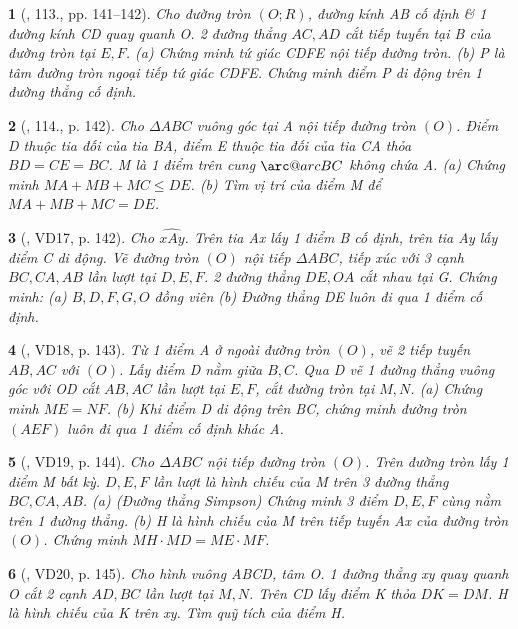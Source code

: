 \documentclass{article}
\makeatletter
\newcommand{\arc@char}{{\usefont{U}{tipa}{m}{n}\symbol{62}}}%
\newcommand{\arc}[1]{\mathpalette\arc@arc{#1}}
\newcommand{\arc@arc}[2]{%
	\sbox0{$\m@th#1#2$}%
	\vbox{
		\hbox{\resizebox{\wd0}{\height}{\arc@char}}
		\nointerlineskip
		\box0
	}%
}
\newtheorem{baitoan}{}
\makeatother
\begin{document}
\begin{baitoan}[\cite{Tuyen_Toan_9_old}, 113., pp. 141--142]
	Cho đường tròn $(O;R)$, đường kính AB cố định \& 1 đường kính CD quay quanh O. 2 đường thẳng $AC,AD$ cắt tiếp tuyến tại B của đường tròn tại $E,F$. (a) Chứng minh tứ giác CDFE nội tiếp đường tròn. (b) P là tâm đường tròn ngoại tiếp tứ giác CDFE. Chứng minh điểm P di động trên 1 đường thẳng cố định.
\end{baitoan}

\begin{baitoan}[\cite{Tuyen_Toan_9_old}, 114., p. 142]
	Cho $\Delta ABC$ vuông góc tại A nội tiếp đường tròn $(O)$. Điểm D thuộc tia đối của tia BA, điểm E thuộc tia đối của tia CA thỏa $BD = CE = BC$. M là 1 điểm trên cung $\arc{BC}$ không chứa A. (a) Chứng minh $MA + MB + MC\le DE$. (b) Tìm vị trí của điểm M để $MA + MB + MC = DE$.
\end{baitoan}

\begin{baitoan}[\cite{Tuyen_Toan_9_old}, VD17, p. 142]
	Cho $\widehat{xAy}$. Trên tia Ax lấy 1 điểm B cố định, trên tia Ay lấy điểm C di động. Vẽ đường tròn $(O)$ nội tiếp $\Delta ABC$, tiếp xúc với 3 cạnh $BC,CA,AB$ lần lượt tại $D,E,F$. 2 đường thẳng $DE,OA$ cắt nhau tại G. Chứng minh: (a) $B,D,F,G,O$ đồng viên (b) Đường thẳng DE luôn đi qua 1 điểm cố định.
\end{baitoan}

\begin{baitoan}[\cite{Tuyen_Toan_9_old}, VD18, p. 143]
	Từ 1 điểm A ở ngoài đường tròn $(O)$, vẽ 2 tiếp tuyến $AB,AC$ với $(O)$. Lấy điểm D nằm giữa $B,C$. Qua D vẽ 1 đường thẳng vuông góc với OD cắt $AB,AC$ lần lượt tại $E,F$, cắt đường tròn tại $M,N$. (a) Chứng minh $ME = NF$. (b) Khi điểm D di động trên BC, chứng minh đường tròn $(AEF)$ luôn đi qua 1 điểm cố định khác A.
\end{baitoan}

\begin{baitoan}[\cite{Tuyen_Toan_9_old}, VD19, p. 144]
	Cho $\Delta ABC$ nội tiếp đường tròn $(O)$. Trên đường tròn lấy 1 điểm M bất kỳ. $D,E,F$ lần lượt là hình chiếu của M trên 3 đường thẳng $BC,CA,AB$. (a) {\rm(Đường thẳng Simpson)} Chứng minh 3 điểm $D,E,F$ cùng nằm trên 1 đường thẳng. (b) H là hình chiếu của M trên tiếp tuyến Ax của đường tròn $(O)$. Chứng minh $MH\cdot MD = ME\cdot MF$.
\end{baitoan}

\begin{baitoan}[\cite{Tuyen_Toan_9_old}, VD20, p. 145]
	Cho hình vuông ABCD, tâm O. 1 đường thẳng xy quay quanh O cắt 2 cạnh $AD,BC$ lần lượt tại $M,N$. Trên CD lấy điểm K thỏa $DK = DM$. H là hình chiếu của K trên xy. Tìm quỹ tích của điểm H.
\end{baitoan}
\end{document}
